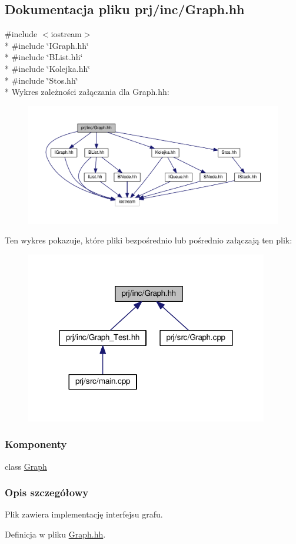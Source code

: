 \hypertarget{_graph_8hh}{\subsection{Dokumentacja pliku prj/inc/\-Graph.hh}
\label{_graph_8hh}
}
{\ttfamily \#include $<$iostream$>$}\\*
{\ttfamily \#include \char`\"{}I\-Graph.\-hh\char`\"{}}\\*
{\ttfamily \#include \char`\"{}B\-List.\-hh\char`\"{}}\\*
{\ttfamily \#include \char`\"{}Kolejka.\-hh\char`\"{}}\\*
{\ttfamily \#include \char`\"{}Stos.\-hh\char`\"{}}\\*
Wykres zależności załączania dla Graph.\-hh\-:
\nopagebreak
\begin{figure}[H]
\begin{center}
\leavevmode
\includegraphics[width=350pt]{_graph_8hh__incl}
\end{center}
\end{figure}
Ten wykres pokazuje, które pliki bezpośrednio lub pośrednio załączają ten plik\-:
\nopagebreak
\begin{figure}[H]
\begin{center}
\leavevmode
\includegraphics[width=300pt]{_graph_8hh__dep__incl}
\end{center}
\end{figure}
\subsubsection*{Komponenty}
\begin{DoxyCompactItemize}
\item 
class \hyperlink{class_graph}{Graph}
\end{DoxyCompactItemize}


\subsubsection{Opis szczegółowy}
Plik zawiera implementację interfejsu grafu. 

Definicja w pliku \hyperlink{_graph_8hh_source}{Graph.\-hh}.

